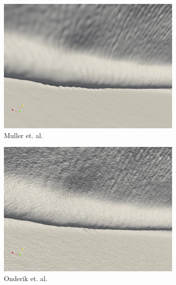 \begin{figure}
	\begin{center}
		\begin{subfigure}[b]{0.48\textwidth}
			\includegraphics[width=\textwidth]{figures/MullerEtAlForRelWorkDoubleDamBreak2.png}
			\caption{Muller et. al.}
		\end{subfigure}
		\begin{subfigure}[b]{0.48\textwidth}
			\includegraphics[width=\textwidth]{figures/OnderikEtAlForRelWorkDoubleDamBreak2.png}
			\caption{Onderik et. al.}
		\end{subfigure}
		\begin{subfigure}[b]{0.48\textwidth}

\end{subfigure}
\end{center}
\end{figure}

